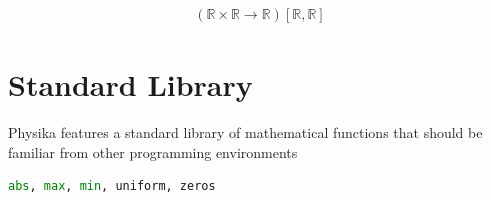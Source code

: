 \documentclass[book.tex]{subfiles}
\begin{document}
\begin{align}(\mathbb{R}\times\mathbb{R}\to\mathbb{R})[\mathbb{R}, \mathbb{R}]
\end{align}

\section{Standard Library}

Physika features a standard library of mathematical functions that should be familiar from other programming environments

\begin{lstlisting}[language=python]
abs, max, min, uniform, zeros
\end{lstlisting}
\end{document}
